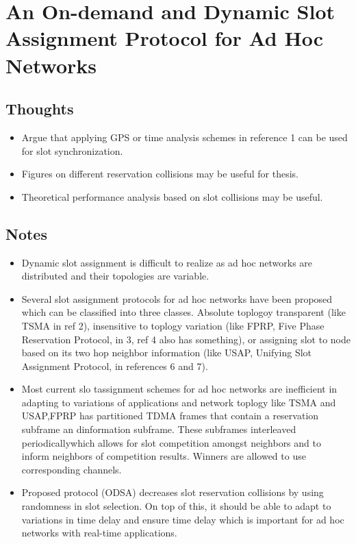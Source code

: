 \documentclass{article}
\begin{document}
\section{An On-demand and Dynamic Slot Assignment Protocol for Ad Hoc Networks}

\subsection{Thoughts}
\begin{itemize}
    \item Argue that applying GPS or time analysis schemes in reference 1 can be used for slot synchronization.
    \item Figures on different reservation collisions may be useful for thesis.
    \item Theoretical performance analysis based on slot collisions may be useful.
\end{itemize}

\subsection{Notes}
\begin{itemize}
    \item Dynamic slot assignment is difficult to realize as ad hoc networks are distributed and their topologies are variable.
    \item Several slot assignment protocols for ad hoc networks have been proposed which can be classified into three classes.  Absolute toplogoy transparent (like TSMA in ref 2), insensitive to toplogy variation (like FPRP, Five Phase Reservation Protocol, in 3, ref 4 also has something), or assigning slot to node based on its two hop neighbor information (like USAP, Unifying Slot Assignment Protocol, in references 6 and 7).
    \item Most current slo tassignment schemes for ad hoc networks are inefficient in adapting to variations of applications and network toplogy like TSMA and USAP,FPRP has partitioned TDMA frames that contain a reservation subframe an dinformation subframe.  These subframes interleaved periodicallywhich allows for slot competition amongst neighbors and to inform neighbors of competition results.  Winners are allowed to use corresponding channels.
    \item Proposed protocol (ODSA) decreases slot reservation collisions by using randomness in slot selection.  On top of this, it should be able to adapt to variations in time delay and ensure time delay which is important for ad hoc networks with real-time applications.
\end{itemize}
\end{document}

